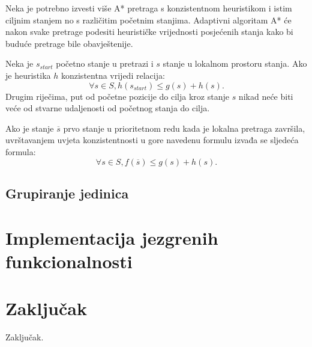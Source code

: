 \documentclass[times, utf8, zavrsni, numeric]{fer}
\begin{document}
\par Neka je potrebno izvesti više A* pretraga s konzistentnom heuristikom i istim ciljnim stanjem no s različitim početnim stanjima. Adaptivni algoritam A* će nakon svake pretrage podesiti heurističke vrijednosti posjećenih stanja kako bi buduće pretrage bile obavještenije\cite{article:RTAAStar}.

\par Neka je \(s_{start}\) početno stanje u pretrazi i \(s\) stanje u lokalnom prostoru stanja. Ako je heuristika \(h\) konzistentna vrijedi relacija:
\[\forall s \in S, h(s_{start}) \leq g(s) + h(s).\]
Drugim riječima, put od početne pozicije do cilja kroz stanje \(s\) nikad neće biti veće od stvarne udaljenosti od početnog stanja do cilja.

\par Ako je stanje \(\overline{s}\) prvo stanje u prioritetnom redu kada je lokalna pretraga završila, uvrštavanjem uvjeta konzistentnosti u gore navedenu formulu izvađa se sljedeća formula:
\[\forall s \in S, f(\overline{s}) \leq g(s) + h(s).\]

\section{Grupiranje jedinica}\label{sec:grouping}

\chapter{Implementacija jezgrenih funkcionalnosti}\label{ch:implementation}

\chapter{Zaključak}\label{ch:conclusion}
Zaključak.



\end{document}
